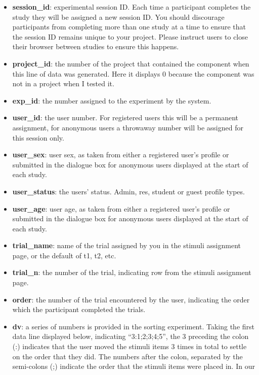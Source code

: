 \documentclass[]{book}
\providecommand{\tightlist}{%
  \setlength{\itemsep}{0pt}\setlength{\parskip}{0pt}}
\begin{document}
\begin{itemize}
\tightlist
\item
  \textbf{session\_id}: experimental session ID. Each time a participant
  completes the study they will be assigned a new session ID. You should
  discourage participants from completing more than one study at a time
  to ensure that the session ID remains unique to your project. Please
  instruct users to close their browser between studies to ensure this
  happens.
\item
  \textbf{project\_id}: the number of the project that contained the
  component when this line of data was generated. Here it displays 0
  because the component was not in a project when I tested it.
\item
  \textbf{exp\_id}: the number assigned to the experiment by the system.
\item
  \textbf{user\_id}: the user number. For registered users this will be
  a permanent assignment, for anonymous users a throwaway number will be
  assigned for this session only.
\item
  \textbf{user\_sex}: user sex, as taken from either a registered user's
  profile or submitted in the dialogue box for anonymous users displayed
  at the start of each study.
\item
  \textbf{user\_status}: the users' status. Admin, res, student or guest
  profile types.
\item
  \textbf{user\_age}: user age, as taken from either a registered user's
  profile or submitted in the dialogue box for anonymous users displayed
  at the start of each study.
\item
  \textbf{trial\_name}: name of the trial assigned by you in the stimuli
  assignment page, or the default of t1, t2, etc.
\item
  \textbf{trial\_n}: the number of the trial, indicating row from the
  stimuli assignment page.
\item
  \textbf{order}: the number of the trial encountered by the user,
  indicating the order which the participant completed the trials.
\item
  \textbf{dv}: a series of numbers is provided in the sorting
  experiment. Taking the first data line displayed below, indicating
  ``3:1;2;3;4;5'', the 3 preceding the colon (:) indicates that the user
  moved the stimuli items 3 times in total to settle on the order that
  they did. The numbers after the colon, separated by the semi-colons
  (;) indicate the order that the stimuli items were placed in. In our

\end{itemize}
\end{document}
